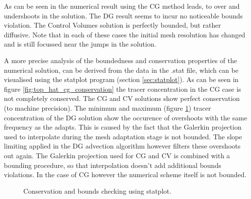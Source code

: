 As can be seen in the numerical result using the CG method leads, to over and
undershoots in the solution. The DG result seems to incur no noticeable bounds
violation. The Control Volumes solution is perfectly bounded, but rather diffusive. Note that in each of
these cases the initial mesh resolution has changed and is still focussed near the jumps in the solution.

A more precise analysis of the boundedness and conservation properties of the numerical solution, can be
derived from the data in the .stat file, which can be visualised using the statplot program
(section \ref{sec:statplot}). As can be seen in figure \ref{fig:top_hat_cg_conservation} the tracer
concentration in the CG case is not completely conserved.
The CG and CV solutions show perfect conservation (to machine precision). The minimum
and maximum (figure \ref{fig:top_hat_dg_max}) tracer concentration of the
DG solution show the occurence of overshoots with the same frequency as the adapts. This is caused by the
fact that the Galerkin projection used to interpolate during the mesh adaptation stage is not
bounded. The slope limiting applied in the DG advection algorithm however filters these overshoots
out again. The Galerkin projection used for CG and CV is combined with a bounding procedure, so
that interpolation doesn't add additional bounds violations. In the case of CG however the numerical
scheme itself is not bounded.

\begin{figure}
  \centering
    \label{fig:top_hat_cg_conservation}
    \label{fig:top_hat_dg_max}
  \caption{Conservation and bounds checking using statplot.}
\end{figure}

